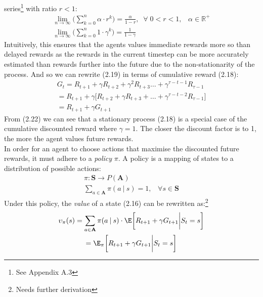 series\footnote{See Appendix A.3} with ratio $r < 1$:
\begin{equation}
    \begin{gathered}
        \lim_{n \rightarrow \infty} \biggl( \sum_{k= 0}^{n} \alpha \cdot r^k \biggl) = \frac{\alpha}{1-r}, \;\; \forall \; 0 < r < 1, \;\;\; \alpha \in \mathbb{R}^+ \\
    \lim_{n \rightarrow \infty}\biggl(\sum_{k=0}^n 1 \cdot \gamma^k \biggl) = \frac{1}{1 - \gamma}
    \end{gathered}
\end{equation}
Intuitively, this ensures that the agents values immediate rewards more so than delayed rewards as
the rewards in the current timestep can be more accurately estimated than rewards further into 
the future due to the non-stationarity of the process.
And so we can rewrite (2.19) in terms of cumulative reward (2.18):
\begin{equation}
    \begin{gathered}
        G_t = R_{t+1} + \gamma R_{t+2} + \gamma^2 R_{t+3} \hdots + \gamma^{\tau-t-1}R_{\tau-1}\\
        = R_{t+1} + \gamma \biggl[R_{t+2} + \gamma R_{t+3} + \hdots +\gamma^{\tau-t-2}R_{\tau-1} \biggl] \\
        = R_{t+1} + \gamma G_{t+1}
    \end{gathered}
\end{equation}
From (2.22) we can see that a stationary process (2.18) is a special case of the cumulative
discounted reward where $\gamma = 1$. The closer the discount factor is to 1, the more
the agent values future rewards.\\
In order for an agent to choose actions that maximise the discounted future rewards, it 
must adhere to a \emph{policy} $\pi$. A policy is a mapping of states to a distribution
of possible actions:
\begin{equation}
    \begin{gathered}
        \pi: \mathbf{S} \rightarrow P(\mathbf{A}) \\
        \sum_{a \in \mathbf{A}} \pi(a \: | \: s) = 1, \;\;\; \forall s \in \mathbf{S}
    \end{gathered}
\end{equation}
Under this policy, the \emph{value} of a state (2.16) can be rewritten as:\footnote{Needs further derivation}
\begin{equation}
    \begin{gathered}
        \upsilon_\pi(s) = \sum_{a \in \mathbf{A}}\pi(a \: | \:s) \cdot \E \biggl [R_{t+1} + \gamma G_{t+1} \biggl | S_t = s \biggl] \\
        = \E_\pi \biggl [R_{t+1} + \gamma G_{t+1} \biggl | S_t = s \biggl]
    \end{gathered} 
\end{equation}
